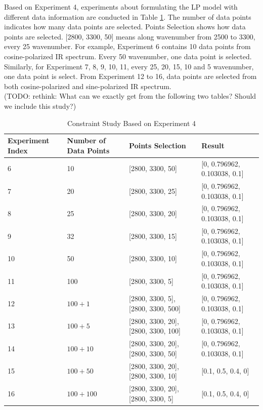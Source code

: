 Based on Experiment 4, experiments about formulating the LP model with different data information are conducted in Table \ref{tab:3.4}. The number of data points indicates how many data points are selected. Points Selection shows how data points are selected. [2800, 3300, 50] means along wavenumber from 2500 to 3300, every 25 wavenumber. For example, Experiment 6 contains 10 data points from cosine-polarized IR spectrum. Every 50 wavenumber, one data point is selected. Similarly, for Experiment 7, 8, 9, 10, 11, every 25, 20, 15, 10 and 5 wavenumber, one data point is select. From Experiment 12 to 16, data points are selected from both cosine-polarized and sine-polarized IR spectrum. \\

(TODO: rethink: What can we exactly get from the following two tables? Should we include this study?)

\begin{table} \small \label{tab:3.4}
\begin{center}
\begin{tabular}{| l | l | p{3cm} | l |} \hline
	Experiment Index & Number of Data Points & Points Selection & Result \\ \hline
	6 & 10 & [2800, 3300, 50] & [0, 0.796962, 0.103038, 0.1] \\ \hline
	7 & 20 & [2800, 3300, 25] & [0, 0.796962, 0.103038, 0.1] \\ \hline
	8 & 25 & [2800, 3300, 20] & [0, 0.796962, 0.103038, 0.1] \\ \hline
	9 & 32 & [2800, 3300, 15] & [0, 0.796962, 0.103038, 0.1] \\ \hline
	10 & 50 & [2800, 3300, 10] & [0, 0.796962, 0.103038, 0.1] \\ \hline
	11 & 100 & [2800, 3300, 5] & [0, 0.796962, 0.103038, 0.1] \\ \hline
	12 & $100 + 1$ & [2800, 3300, 5], [2800, 3300, 500] & [0, 0.796962, 0.103038, 0.1] \\ \hline
	13 & $100 + 5$ & [2800, 3300, 20], [2800, 3300, 100] & [0, 0.796962, 0.103038, 0.1] \\ \hline
	14 & $100 + 10$ & [2800, 3300, 20], [2800, 3300, 50] & [0, 0.796962, 0.103038, 0.1] \\ \hline
	15 & $100 + 50$ & [2800, 3300, 20], [2800, 3300, 10] & [0.1, 0.5, 0.4, 0] \\ \hline
	16 & $100 + 100$ & [2800, 3300, 20], [2800, 3300, 5] & [0.1, 0.5, 0.4, 0] \\ 
	\hline
\end{tabular} 
\end{center}
\caption{Constraint Study Based on Experiment 4}
\end{table}

